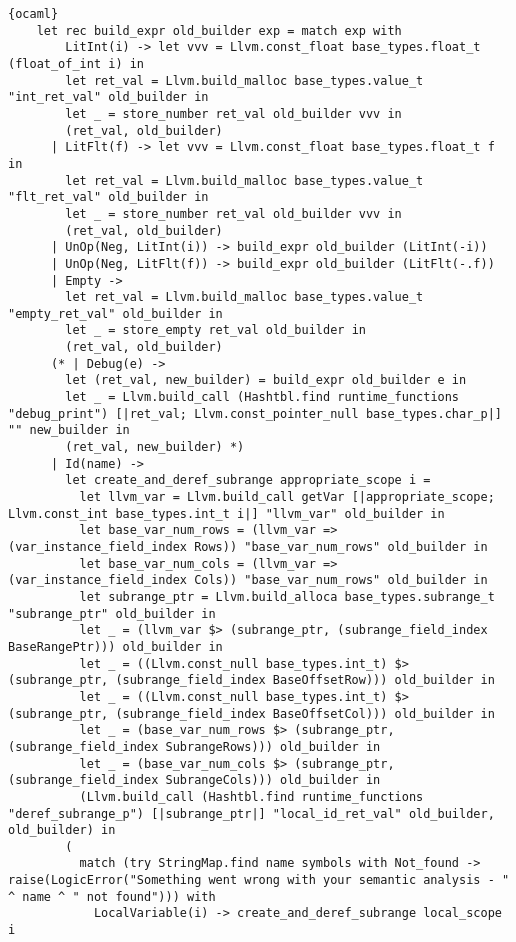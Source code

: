 \begin{lstlisting}{ocaml}
    let rec build_expr old_builder exp = match exp with
        LitInt(i) -> let vvv = Llvm.const_float base_types.float_t (float_of_int i) in
        let ret_val = Llvm.build_malloc base_types.value_t "int_ret_val" old_builder in
        let _ = store_number ret_val old_builder vvv in
        (ret_val, old_builder)
      | LitFlt(f) -> let vvv = Llvm.const_float base_types.float_t f in
        let ret_val = Llvm.build_malloc base_types.value_t "flt_ret_val" old_builder in
        let _ = store_number ret_val old_builder vvv in
        (ret_val, old_builder)
      | UnOp(Neg, LitInt(i)) -> build_expr old_builder (LitInt(-i))
      | UnOp(Neg, LitFlt(f)) -> build_expr old_builder (LitFlt(-.f))
      | Empty ->
        let ret_val = Llvm.build_malloc base_types.value_t "empty_ret_val" old_builder in
        let _ = store_empty ret_val old_builder in
        (ret_val, old_builder)
      (* | Debug(e) ->
        let (ret_val, new_builder) = build_expr old_builder e in
        let _ = Llvm.build_call (Hashtbl.find runtime_functions "debug_print") [|ret_val; Llvm.const_pointer_null base_types.char_p|] "" new_builder in
        (ret_val, new_builder) *)
      | Id(name) ->
        let create_and_deref_subrange appropriate_scope i =
          let llvm_var = Llvm.build_call getVar [|appropriate_scope; Llvm.const_int base_types.int_t i|] "llvm_var" old_builder in
          let base_var_num_rows = (llvm_var => (var_instance_field_index Rows)) "base_var_num_rows" old_builder in
          let base_var_num_cols = (llvm_var => (var_instance_field_index Cols)) "base_var_num_rows" old_builder in
          let subrange_ptr = Llvm.build_alloca base_types.subrange_t "subrange_ptr" old_builder in
          let _ = (llvm_var $> (subrange_ptr, (subrange_field_index BaseRangePtr))) old_builder in
          let _ = ((Llvm.const_null base_types.int_t) $> (subrange_ptr, (subrange_field_index BaseOffsetRow))) old_builder in
          let _ = ((Llvm.const_null base_types.int_t) $> (subrange_ptr, (subrange_field_index BaseOffsetCol))) old_builder in
          let _ = (base_var_num_rows $> (subrange_ptr, (subrange_field_index SubrangeRows))) old_builder in
          let _ = (base_var_num_cols $> (subrange_ptr, (subrange_field_index SubrangeCols))) old_builder in
          (Llvm.build_call (Hashtbl.find runtime_functions "deref_subrange_p") [|subrange_ptr|] "local_id_ret_val" old_builder, old_builder) in
        (
          match (try StringMap.find name symbols with Not_found -> raise(LogicError("Something went wrong with your semantic analysis - " ^ name ^ " not found"))) with
            LocalVariable(i) -> create_and_deref_subrange local_scope i

\end{lstlisting}
